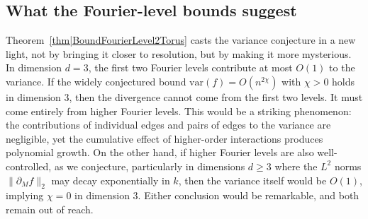 \documentclass[reqno]{amsart}
\begin{document}
\subsection{What the Fourier-level bounds suggest}

Theorem~\ref{thm|BoundFourierLevel2Torus} casts the variance 
conjecture in a new light, not by bringing it closer to resolution, 
but by making it more mysterious. In dimension $d=3$, the first two 
Fourier levels contribute at most $O(1)$ to the variance. If the 
widely conjectured bound $\mathrm{var}(f)=O(n^{2\chi})$ with 
$\chi>0$ holds in dimension $3$, then the divergence cannot come 
from the first two levels. It must come entirely from higher Fourier 
levels. This would be a striking phenomenon: the contributions of 
individual edges and pairs of edges to the variance are negligible, 
yet the cumulative effect of higher-order interactions produces 
polynomial growth. On the other hand, if higher Fourier levels are 
also well-controlled, as we conjecture, particularly in dimensions 
$d\geq 3$ where the $L^2$ norms $\|\partial_M f\|_2$ may decay 
exponentially in $k$, then the variance itself would be $O(1)$, 
implying $\chi=0$ in dimension $3$. Either conclusion would be 
remarkable, and both remain out of reach.
\end{document}
